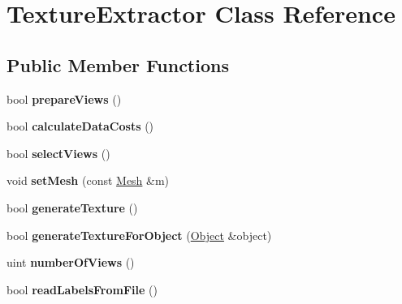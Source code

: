\hypertarget{class_texture_extractor}{}\section{Texture\+Extractor Class Reference}
\label{class_texture_extractor}
\subsection*{Public Member Functions}
\begin{DoxyCompactItemize}
\item 
\hypertarget{class_texture_extractor_a5d1efa1c5208f8a1e67142dd38fbf5a2}{}bool {\bfseries prepare\+Views} ()\label{class_texture_extractor_a5d1efa1c5208f8a1e67142dd38fbf5a2}

\item 
\hypertarget{class_texture_extractor_af7e364344bda2e0c6784c82b50a6f979}{}bool {\bfseries calculate\+Data\+Costs} ()\label{class_texture_extractor_af7e364344bda2e0c6784c82b50a6f979}

\item 
\hypertarget{class_texture_extractor_abeb85c1ced22591fda614af1f351e817}{}bool {\bfseries select\+Views} ()\label{class_texture_extractor_abeb85c1ced22591fda614af1f351e817}

\item 
\hypertarget{class_texture_extractor_ae02d3f7a8ebf636fd7fc17ab13570f59}{}void {\bfseries set\+Mesh} (const \hyperlink{class_mesh}{Mesh} \&m)\label{class_texture_extractor_ae02d3f7a8ebf636fd7fc17ab13570f59}

\item 
\hypertarget{class_texture_extractor_a58176e3b3dc4f2edaaa900a7e922ab05}{}bool {\bfseries generate\+Texture} ()\label{class_texture_extractor_a58176e3b3dc4f2edaaa900a7e922ab05}

\item 
\hypertarget{class_texture_extractor_aeda3235d55d4dec0d1f40d42bc97a2c4}{}bool {\bfseries generate\+Texture\+For\+Object} (\hyperlink{struct_object}{Object} \&object)\label{class_texture_extractor_aeda3235d55d4dec0d1f40d42bc97a2c4}

\item 
\hypertarget{class_texture_extractor_a57b2eef07397ceeedf461343aff6afbc}{}uint {\bfseries number\+Of\+Views} ()\label{class_texture_extractor_a57b2eef07397ceeedf461343aff6afbc}

\item 
\hypertarget{class_texture_extractor_ad3855ac7764dc5af24e776e928bed802}{}bool {\bfseries read\+Labels\+From\+File} ()\label{class_texture_extractor_ad3855ac7764dc5af24e776e928bed802}


\end{DoxyCompactItemize}
